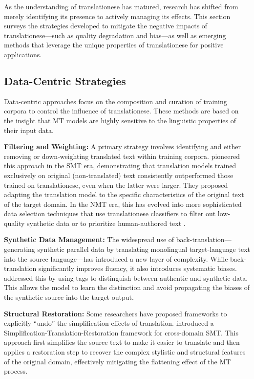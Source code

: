\documentclass[11pt,a4paper]{article}
\begin{document}
As the understanding of translationese has matured, research has shifted from merely identifying its presence to actively managing its effects. This section surveys the strategies developed to mitigate the negative impacts of translationese—such as quality degradation and bias—as well as emerging methods that leverage the unique properties of translationese for positive applications.

\subsection{Data-Centric Strategies}

Data-centric approaches focus on the composition and curation of training corpora to control the influence of translationese. These methods are based on the insight that MT models are highly sensitive to the linguistic properties of their input data.

\textbf{Filtering and Weighting:} A primary strategy involves identifying and either removing or down-weighting translated text within training corpora. \citet{lembersky2013improving} pioneered this approach in the SMT era, demonstrating that translation models trained exclusively on original (non-translated) text consistently outperformed those trained on translationese, even when the latter were larger. They proposed adapting the translation model to the specific characteristics of the original text of the target domain. In the NMT era, this has evolved into more sophisticated data selection techniques that use translationese classifiers to filter out low-quality synthetic data or to prioritize human-authored text \cite{pylypenko2021comparing}.

\textbf{Synthetic Data Management:} The widespread use of back-translation---generating synthetic parallel data by translating monolingual target-language text into the source language---has introduced a new layer of complexity. While back-translation significantly improves fluency, it also introduces systematic biases. \citet{riley2020translationese} addressed this by using tags to distinguish between authentic and synthetic data. This allows the model to learn the distinction and avoid propagating the biases of the synthetic source into the target output.

\textbf{Structural Restoration:} Some researchers have proposed frameworks to explicitly ``undo'' the simplification effects of translation. \citet{chen2012simplification} introduced a Simplification-Translation-Restoration framework for cross-domain SMT. This approach first simplifies the source text to make it easier to translate and then applies a restoration step to recover the complex stylistic and structural features of the original domain, effectively mitigating the flattening effect of the MT process.
\end{document}
